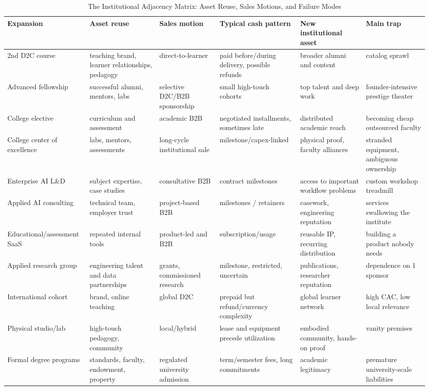 \begin{table}[t]
\centering
\small
\caption{The Institutional Adjacency Matrix: Asset Reuse, Sales Motions, and Failure Modes}
\label{tab:ch36_adjacency_matrix}
\begin{tabularx}{\textwidth}{p{2.8cm} p{2.6cm} p{2.6cm} p{2.6cm} p{2.6cm} X}
\toprule
\textbf{ Expansion } & \textbf{ Asset reuse } & \textbf{ Sales motion } & \textbf{ Typical cash pattern } & \textbf{ New institutional asset } & \textbf{ Main trap } \\
\midrule
 2nd D2C course  &  teaching brand, learner relationships, pedagogy  &  direct-to-learner  &  paid before/\allowbreak during delivery, possible refunds  &  broader alumni and content  &  catalog sprawl  \\
 Advanced fellowship  &  successful alumni, mentors, labs  &  selective D2C/\allowbreak B2B sponsorship  &  small high-touch cohorts  &  top talent and deep work  &  founder-intensive prestige theater  \\
 College elective  &  curriculum and assessment  &  academic B2B  &  negotiated installments, sometimes late  &  distributed academic reach  &  becoming cheap outsourced faculty  \\
 College center of excellence  &  labs, mentors, assessments  &  long-cycle institutional sale  &  milestone/\allowbreak capex-linked  &  physical proof, faculty alliances  &  stranded equipment, ambiguous ownership  \\
 Enterprise AI L\&D  &  subject expertise, case studies  &  consultative B2B  &  contract milestones  &  access to important workflow problems  &  custom workshop treadmill  \\
 Applied AI consulting  &  technical team, employer trust  &  project-based B2B  &  milestones / retainers  &  casework, engineering reputation  &  services swallowing the institute  \\
 Educational/\allowbreak assessment SaaS  &  repeated internal tools  &  product-led and B2B  &  subscription/\allowbreak usage  &  reusable IP, recurring distribution  &  building a product nobody needs  \\
 Applied research group  &  engineering talent and data partnerships  &  grants, commissioned research  &  milestone, restricted, uncertain  &  publications, researcher reputation  &  dependence on 1 sponsor  \\
 International cohort  &  brand, online teaching  &  global D2C  &  prepaid but refund/\allowbreak currency complexity  &  global learner network  &  high CAC, low local relevance  \\
 Physical studio/\allowbreak lab  &  high-touch pedagogy, community  &  local/\allowbreak hybrid  &  lease and equipment precede utilization  &  embodied community, hands-on proof  &  vanity premises  \\
 Formal degree programs  &  standards, faculty, endowment, property  &  regulated university admission  &  term/\allowbreak semester fees, long commitments  &  academic legitimacy  &  premature university-scale liabilities  \\
\bottomrule
\end{tabularx}
\end{table}

